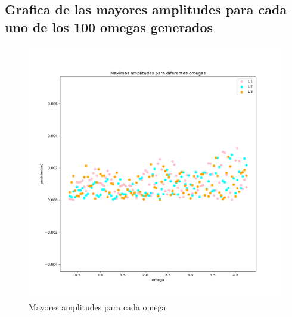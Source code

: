 \documentclass[11pt,letterpaper]{exam}
\begin{document}
\subsection{Grafica de las mayores amplitudes para cada uno de los 100 omegas generados}
\begin{figure}[H]
    \centering
    \includegraphics[width=1.1\textwidth]{plot_omegas.pdf}
    \caption{Mayores amplitudes para cada omega}
    \label{fig:my_label}
\end{figure}
\end{document}
